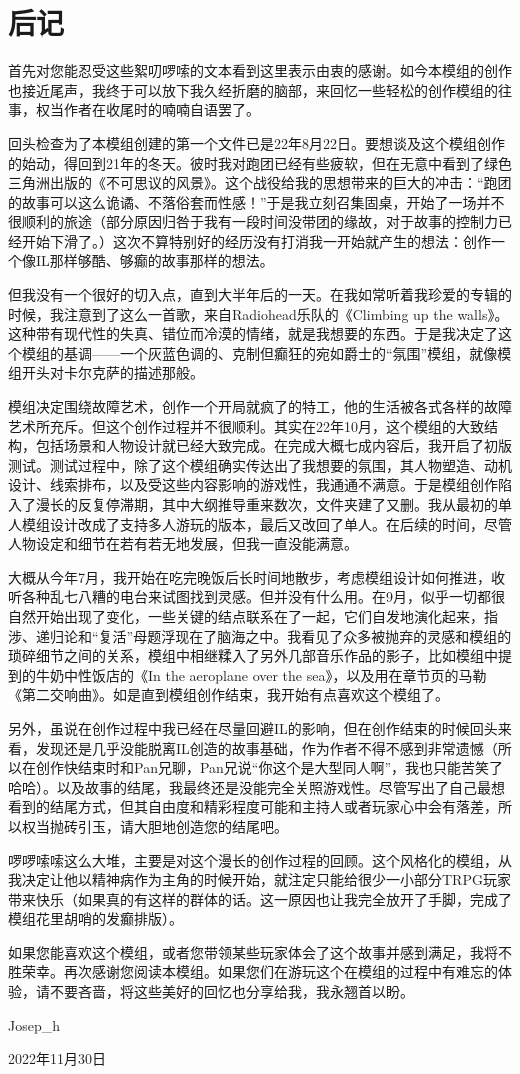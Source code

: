 \chapter{后记}

首先对您能忍受这些絮叨啰嗦的文本看到这里表示由衷的感谢。如今本模组的创作也接近尾声，我终于可以放下我久经折磨的脑部，来回忆一些轻松的创作模组的往事，权当作者在收尾时的喃喃自语罢了。

回头检查为了本模组创建的第一个文件已是22年8月22日。要想谈及这个模组创作的始动，得回到21年的冬天。彼时我对跑团已经有些疲软，但在无意中看到了绿色三角洲出版的《不可思议的风景》。这个战役给我的思想带来的巨大的冲击：“跑团的故事可以这么诡谲、不落俗套而性感！”于是我立刻召集固桌，开始了一场并不很顺利的旅途（部分原因归咎于我有一段时间没带团的缘故，对于故事的控制力已经开始下滑了。）这次不算特别好的经历没有打消我一开始就产生的想法：创作一个像IL那样够酷、够癫的故事那样的想法。

但我没有一个很好的切入点，直到大半年后的一天。在我如常听着我珍爱的专辑的时候，我注意到了这么一首歌，来自Radiohead乐队的《Climbing up the walls》。这种带有现代性的失真、错位而冷漠的情绪，就是我想要的东西。于是我决定了这个模组的基调——一个灰蓝色调的、克制但癫狂的宛如爵士的“氛围”模组，就像模组开头对卡尔克萨的描述那般。

模组决定围绕故障艺术，创作一个开局就疯了的特工，他的生活被各式各样的故障艺术所充斥。但这个创作过程并不很顺利。其实在22年10月，这个模组的大致结构，包括场景和人物设计就已经大致完成。在完成大概七成内容后，我开启了初版测试。测试过程中，除了这个模组确实传达出了我想要的氛围，其人物塑造、动机设计、线索排布，以及受这些内容影响的游戏性，我通通不满意。于是模组创作陷入了漫长的反复停滞期，其中大纲推导重来数次，文件夹建了又删。我从最初的单人模组设计改成了支持多人游玩的版本，最后又改回了单人。在后续的时间，尽管人物设定和细节在若有若无地发展，但我一直没能满意。

大概从今年7月，我开始在吃完晚饭后长时间地散步，考虑模组设计如何推进，收听各种乱七八糟的电台来试图找到灵感。但并没有什么用。在9月，似乎一切都很自然开始出现了变化，一些关键的结点联系在了一起，它们自发地演化起来，指涉、递归论和“复活”母题浮现在了脑海之中。我看见了众多被抛弃的灵感和模组的琐碎细节之间的关系，模组中相继糅入了另外几部音乐作品的影子，比如模组中提到的牛奶中性饭店的《In the aeroplane over the sea》，以及用在章节页的马勒《第二交响曲》。如是直到模组创作结束，我开始有点喜欢这个模组了。

另外，虽说在创作过程中我已经在尽量回避IL的影响，但在创作结束的时候回头来看，发现还是几乎没能脱离IL创造的故事基础，作为作者不得不感到非常遗憾（所以在创作快结束时和Pan兄聊，Pan兄说“你这个是大型同人啊”，我也只能苦笑了哈哈）。以及故事的结尾，我最终还是没能完全关照游戏性。尽管写出了自己最想看到的结尾方式，但其自由度和精彩程度可能和主持人或者玩家心中会有落差，所以权当抛砖引玉，请大胆地创造您的结尾吧。

啰啰嗦嗦这么大堆，主要是对这个漫长的创作过程的回顾。这个风格化的模组，从我决定让他以精神病作为主角的时候开始，就注定只能给很少一小部分TRPG玩家带来快乐（如果真的有这样的群体的话。这一原因也让我完全放开了手脚，完成了模组花里胡哨的发癫排版）。

如果您能喜欢这个模组，或者您带领某些玩家体会了这个故事并感到满足，我将不胜荣幸。再次感谢您阅读本模组。如果您们在游玩这个在模组的过程中有难忘的体验，请不要吝啬，将这些美好的回忆也分享给我，我永翘首以盼。

Josep\_h

2022年11月30日